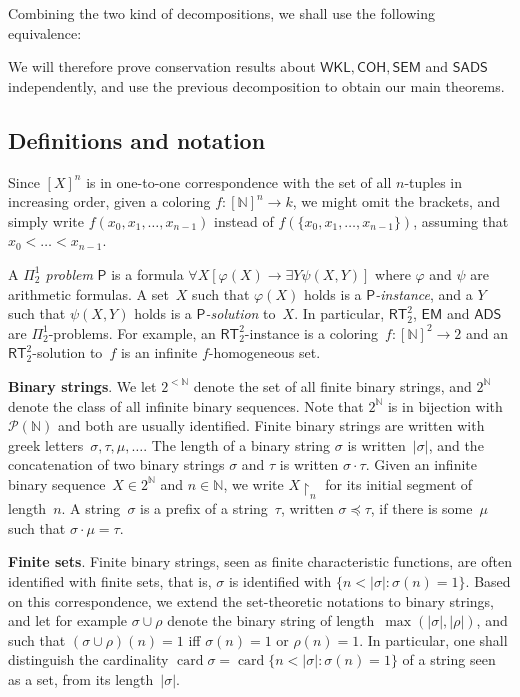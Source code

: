 \documentclass{article}
\numberwithin{theorem}{section}
\newtheorem{proposition}[theorem]{Proposition}
\newcommand{\RCA}{\mathsf{RCA}}
\newcommand{\WKL}{\mathsf{WKL}}
\newcommand{\EM}{\mathsf{EM}}
\newcommand{\SEM}{\mathsf{SEM}}
\newcommand{\ADS}{\mathsf{ADS}}
\newcommand{\SADS}{\mathsf{SADS}}
\newcommand{\COH}{\mathsf{COH}}
\newcommand{\RT}{\mathsf{RT}}
\renewcommand{\P}{\mathcal{P}}
\renewcommand{\P}{\mathcal{P}}
\newcommand{\NN}{\mathbb{N}}
\newcommand{\uh}[0]{{\upharpoonright}}
\newcommand{\card}{\operatorname{card}}
\begin{document}
\bigskip
Combining the two kind of decompositions, we shall use the following equivalence:


We will therefore prove conservation results about $\WKL, \COH, \SEM$ and $\SADS$ independently, and use the previous decomposition to obtain our main theorems.

\subsection{Definitions and notation}

Since $[X]^n$ is in one-to-one correspondence with the set of all $n$-tuples in increasing order, given a coloring $f : [\NN]^n \to k$, we might omit the brackets, and simply write $f(x_0, x_1, \dots, x_{n-1})$ instead of $f(\{x_0, x_1, \dots, x_{n-1}\})$, assuming that $x_0 < \dots < x_{n-1}$.

A \emph{$\Pi^1_2$ problem} $\mathsf{P}$ is a formula $\forall X[\varphi(X) \rightarrow \exists Y \psi(X, Y)]$ where $\varphi$ and $\psi$ are arithmetic formulas. A set~$X$ such that $\varphi(X)$ holds is a \emph{$\mathsf{P}$-instance}, and a $Y$ such that $\psi(X, Y)$ holds is a \emph{$\mathsf{P}$-solution} to~$X$. In particular, $\RT^2_2$, $\EM$ and $\ADS$ are $\Pi^1_2$-problems. For example, an $\RT^2_2$-instance is a coloring~$f : [\NN]^2 \to 2$
and an $\RT^2_2$-solution to~$f$ is an infinite $f$-homogeneous set.
\bigskip

\textbf{Binary strings}. We let $2^{<\NN}$ denote the set of all finite binary strings, and $2^\NN$ denote the class of all infinite binary sequences. Note that $2^\NN$ is in bijection with $\P(\NN)$ and both are usually identified.
Finite binary strings are written with greek letters~$\sigma, \tau, \mu, \dots$. The length of a binary string $\sigma$ is written~$|\sigma|$, and the concatenation of two binary strings $\sigma$ and $\tau$ is written $\sigma \cdot \tau$. Given an infinite binary sequence~$X \in 2^\NN$ and $n \in \NN$, we write $X \uh_n$ for its initial segment of length~$n$. A string~$\sigma$ is a prefix of a string~$\tau$, written $\sigma \preceq \tau$, if there is some~$\mu$ such that $\sigma \cdot \mu = \tau$.
\bigskip

\textbf{Finite sets}. Finite binary strings, seen as finite characteristic functions, are often identified with finite sets, that is, $\sigma$ is identified with $\{ n < |\sigma| : \sigma(n) = 1 \}$. Based on this correspondence, we extend the set-theoretic notations to binary strings, and let for example $\sigma \cup \rho$ denote the binary string of length~$\max(|\sigma|, |\rho|)$, and such that $(\sigma \cup \rho)(n) = 1$ iff $\sigma(n) = 1$ or $\rho(n) = 1$.
In particular, one shall distinguish the cardinality $\card \sigma = \card \{ n < |\sigma| : \sigma(n) = 1 \}$ of a string seen as a set, from its length~$|\sigma|$.
\bigskip
\end{document}
